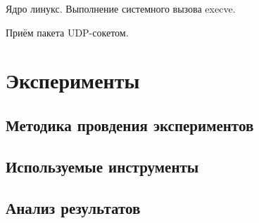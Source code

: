 \documentclass[11pt,twoside,a4paper]{report}
\begin{document}
Ядро линукс. Выполнение системного вызова execve.

Приём пакета UDP-сокетом.

\chapter{Эксперименты}

\section{Методика провдения экспериментов}

\section{Используемые инструменты}

\section{Анализ результатов}
\end{document}
